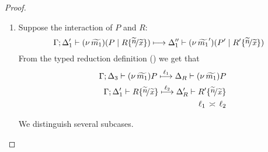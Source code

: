\begin{proof}
\begin{enumerate}
		\item	Suppose the interaction of $P$ and $R$:
		\[
					\horel{\Gamma}{\Delta_1'}{\newsp{\widetilde{m_1}}{P \Par R \subst{\widetilde{n}}{\widetilde{x}} }}
					{\hby{}}
					{\Delta_1''}{\newsp{\widetilde{m_1}'}{P' \Par R' \subst{\widetilde{n}}{\widetilde{x}} }}
				\]
				From the typed reduction definition () we get that
				\begin{eqnarray}
					&&	\horel{\Gamma}{\Delta_3}{\news{\widetilde{m_1}}{P}}
						{\hby{\ell_1}}
						{\Delta_R}{\news{\widetilde{m_1}}{P}}
					\label{lem:trigger_subst_31}
					\\
					&&	\horel{\Gamma}{\Delta_1'}{R \subst{\widetilde{n}}{\widetilde{x}} }
						{\hby{\ell_2}}
						{\Delta_R'}{R' \subst{\widetilde{n}}{\widetilde{x}} }
					\label{lem:trigger_subst_32}
					\\
					&&	\ell_1 \comp \ell_2 \nonumber
				\end{eqnarray}

				We distinguish several subcases.
				\begin{enumerate}[i.]
	

\end{enumerate}
\end{enumerate}
\end{proof}
